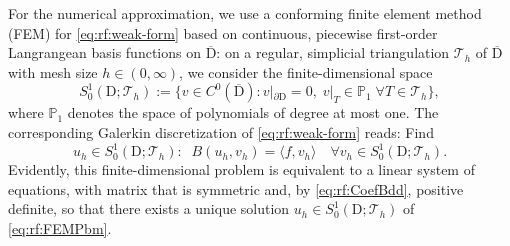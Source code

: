 \documentclass[reqno]{amsart}
\numberwithin{equation}{section}
\newcommand{\bbP}{\mathbb{P}}
\newcommand{\cT}{\mathcal{T}}
\newcommand{\duality}[1]{     \langle #1       \rangle}
\newcommand{\dom}{\mathrm{D}}
\theoremstyle{remark}
\theoremstyle{definition}
\begin{document}
For the numerical approximation, 
we use a conforming finite element method (FEM) 
for \eqref{eq:rf:weak-form} 
based on continuous, piecewise 
first-order Langrangean basis functions on $\overline{\dom}$:
on a regular, simplicial triangulation $\cT_h$ of $\overline{\dom}$ 
with mesh size $h\in(0,\infty)$, 
we consider the finite-dimensional space
%
\[ 
S^1_0(\dom;\cT_h) 
:= 
\bigl\{ v \in C^0(\overline{\dom}) : 
v|_{\partial \dom} =0, \; v|_T \in \bbP_1 \; \forall T\in \cT_h \bigr\},
\]
%
where $\bbP_1$ denotes the space of polynomials 
of degree at most one. 
The corresponding Galerkin discretization 
of \eqref{eq:rf:weak-form} reads: 
Find  
%
\begin{equation}\label{eq:rf:FEMPbm} 
u_h \in S^1_0(\dom;\cT_h): 
\;\; 
B( u_h, v_h ) 
= 
\duality{ f,v_h } 
\quad 
\forall v_h\in S^1_0(\dom;\cT_h).
\end{equation}
%
Evidently, this finite-dimensional problem is equivalent to 
a linear system of equations, with matrix that is symmetric
and, by \eqref{eq:rf:CoefBdd}, positive definite, so that there
exists a unique solution 
$u_h \in  S^1_0(\dom;\cT_h)$ of \eqref{eq:rf:FEMPbm}.
\end{document}
